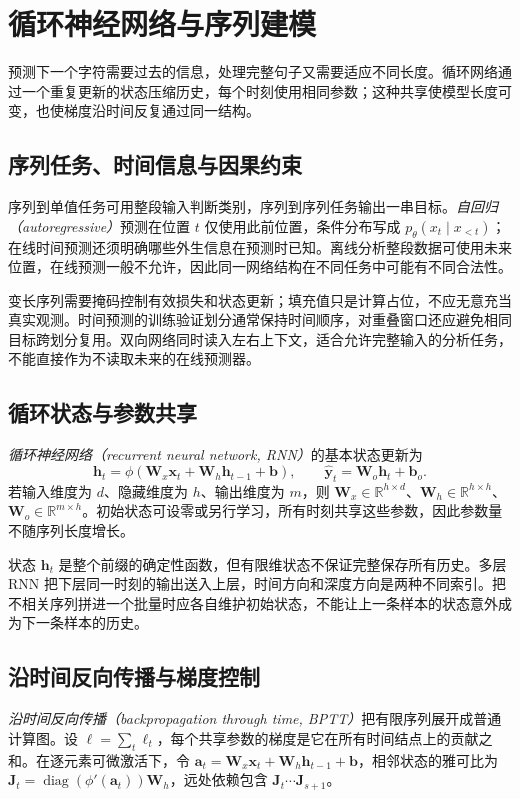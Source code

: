 \setcounter{chapter}{11} %
\chapter{循环神经网络与序列建模}
\label{chap:dl-rnn}
预测下一个字符需要过去的信息，处理完整句子又需要适应不同长度。循环网络通过一个重复更新的状态压缩历史，每个时刻使用相同参数；这种共享使模型长度可变，也使梯度沿时间反复通过同一结构。

\section{序列任务、时间信息与因果约束}
序列到单值任务可用整段输入判断类别，序列到序列任务输出一串目标。\emph{自回归（autoregressive）}预测在位置 $t$ 仅使用此前位置，条件分布写成 $p_\theta(x_t\mid x_{<t})$；在线时间预测还须明确哪些外生信息在预测时已知。离线分析整段数据可使用未来位置，在线预测一般不允许，因此同一网络结构在不同任务中可能有不同合法性。

变长序列需要掩码控制有效损失和状态更新；填充值只是计算占位，不应无意充当真实观测。时间预测的训练验证划分通常保持时间顺序，对重叠窗口还应避免相同目标跨划分复用。双向网络同时读入左右上下文，适合允许完整输入的分析任务，不能直接作为不读取未来的在线预测器。

\section{循环状态与参数共享}
\emph{循环神经网络（recurrent neural network, RNN）}的基本状态更新为
\begin{equation}
\mathbf h_t=\phi(\mathbf W_x\mathbf x_t+\mathbf W_h\mathbf h_{t-1}+\mathbf b),
\qquad \widehat{\mathbf y}_t=\mathbf W_o\mathbf h_t+\mathbf b_o.
\label{eq:dl-rnn-state}
\end{equation}
若输入维度为 $d$、隐藏维度为 $h$、输出维度为 $m$，则 $\mathbf W_x\in\mathbb R^{h\times d}$、$\mathbf W_h\in\mathbb R^{h\times h}$、$\mathbf W_o\in\mathbb R^{m\times h}$。初始状态可设零或另行学习，所有时刻共享这些参数，因此参数量不随序列长度增长。

状态 $\mathbf h_t$ 是整个前缀的确定性函数，但有限维状态不保证完整保存所有历史。多层 RNN 把下层同一时刻的输出送入上层，时间方向和深度方向是两种不同索引。把不相关序列拼进一个批量时应各自维护初始状态，不能让上一条样本的状态意外成为下一条样本的历史。

\section{沿时间反向传播与梯度控制}
\emph{沿时间反向传播（backpropagation through time, BPTT）}把有限序列展开成普通计算图。设 $\ell=\sum_t\ell_t$，每个共享参数的梯度是它在所有时间结点上的贡献之和。在逐元素可微激活下，令 $\mathbf a_t=\mathbf W_x\mathbf x_t+\mathbf W_h\mathbf h_{t-1}+\mathbf b$，相邻状态的雅可比为 $\mathbf J_t=\operatorname{diag}(\phi'(\mathbf a_t))\mathbf W_h$，远处依赖包含 $\mathbf J_t\cdots\mathbf J_{s+1}$。

